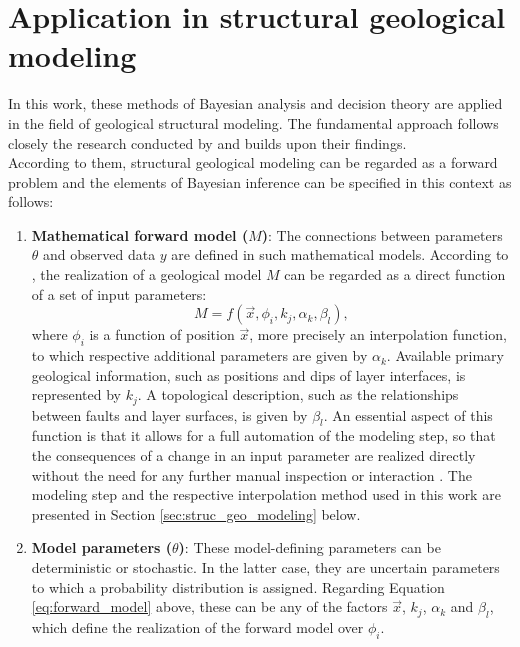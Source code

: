         \section{Application in structural geological modeling}\label{sec:bayes_in_struc_modeling}
        In this work, these methods of Bayesian analysis and decision theory are applied in the field of geological structural modeling. The fundamental approach follows closely the research conducted by \citet{delaVarga2016} and builds upon their findings.\\
        According to them, structural geological modeling can be regarded as a forward problem and the elements of Bayesian inference can be specified in this context as follows:
        \begin{enumerate}
        	\item \textbf{Mathematical forward model ($M$)}: The connections between parameters $\theta$ and observed data $y$ are defined in such mathematical models. According to \citet{delaVarga2016}, the realization of a geological model $M$ can be regarded as a direct function of a set of input parameters:
        	\begin{equation}
        	M = f(\vec{x}, \phi_i, k_j, \alpha_k, \beta_l)\label{eq:forward_model},
        	\end{equation}
        	where $\phi_i$ is a function of position $\vec{x}$, more precisely an interpolation function, to which respective additional parameters are given by $\alpha_k$. Available primary geological information, such as positions and dips of layer interfaces, is represented by $k_j$. A topological description, such as the relationships between faults and layer surfaces, is given by $\beta_l$. An essential aspect of this function is that it allows for a full automation of the modeling step, so that the consequences of a change in an input parameter are realized directly without the need for any further manual inspection or interaction \citep{wellmann2017sandstone, delaVarga2016}. The modeling step and the respective interpolation method used in this work are presented in Section \ref{sec:struc_geo_modeling} below.
        	\item \textbf{Model parameters ($\theta$)}: These model-defining parameters can be deterministic or stochastic. In the latter case, they are uncertain parameters to which a probability distribution is assigned. Regarding Equation \ref{eq:forward_model} above, these can be any of the factors $\vec{x}$, $k_j$, $\alpha_k$ and $\beta_l$, which define the realization of the forward model over $\phi_i$.

\end{enumerate}
